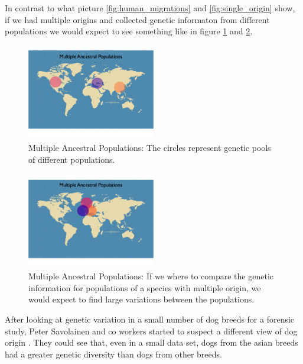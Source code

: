 In contrast to what picture \ref{fig:human_migrations} and \ref{fig:single_origin} show, if we had multiple origins and collected genetic informaton from different populations we would expect to see something like in figure \ref{fig:multiple_origin} and \ref{fig:no_common_variation}.\\

\begin{figure}[ht]
	\centering
		\includegraphics[width=0.5\textwidth]{../pictures/Multiple_ancestors_1.jpg}
	\caption{Multiple Ancestral Populations: The circles represent genetic pools of different populations.}
	\label{fig:multiple_origin}
\end{figure}

\begin{figure}[ht]
	\centering
		\includegraphics[width=0.5\textwidth]{../pictures/Multiple_ancestors_2.jpg}
	\caption{Multiple Ancestral Populations: If we where to compare the genetic information for populations of a species with multiple origin, we would expect to find large variations between the populations.}
	\label{fig:no_common_variation}
\end{figure}

After looking at genetic variation in a small number of dog breeds for a forensic study, Peter Savolainen and co workers started to suspect a different view of dog origin \cite{savo97}. They could see that, even in a small data set, dogs from the asian breeds had a greater genetic diversity than dogs from other breeds.\\

